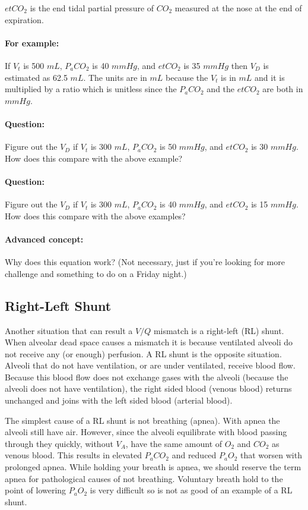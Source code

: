 $etCO_2$ is the end tidal partial pressure of $CO_2$ measured at the nose at the end of expiration.

\paragraph{For example:} If $V_t$ is 500 $mL$, $P_aCO_2$ is 40 $mmHg$, and $etCO_2$ is 35 $mmHg$ then $V_D$ is estimated as 62.5 $mL$. The units are in $mL$ because the $V_t$ is in $mL$ and it is multiplied by a ratio which is unitless since the $P_aCO_2$ and the $etCO_2$ are both in $mmHg$.

\paragraph{Question:} Figure out the $V_D$ if $V_t$ is 300 $mL$, $P_aCO_2$ is 50 $mmHg$, and $etCO_2$ is 30 $mmHg$. How does this compare with the above example? 

\paragraph{Question:} Figure out the $V_D$ if $V_t$ is 300 $mL$, $P_aCO_2$ is 40 $mmHg$, and $etCO_2$ is 15 $mmHg$. How does this compare with the above examples?

\paragraph{Advanced concept:} Why does this equation work? (Not necessary, just if you're looking for more challenge and something to do on a Friday night.)

\subsection{Right-Left Shunt}

Another situation that can result a $V/Q$ mismatch is a right-left (RL) shunt. When alveolar dead space causes a mismatch it is because ventilated alveoli do not receive any (or enough) perfusion. A RL shunt is the opposite situation. Alveoli that do not have ventilation, or are under ventilated, receive blood flow. Because this blood flow does not exchange gases with the alveoli (because the alveoli does not have ventilation), the right sided blood (venous blood) returns unchanged and joins with the left sided blood (arterial blood). 

The simplest cause of a RL shunt is not breathing (apnea). With apnea the alveoli still have air. However, since the alveoli equilibrate with blood passing through they quickly, without $V_A$, have the same amount of $O_2$ and $CO_2$ as venous blood. This results in elevated $P_aCO_2$ and reduced $P_aO_2$ that worsen with prolonged apnea. While holding your breath is apnea, we should reserve the term apnea for pathological causes of not breathing. Voluntary breath hold to the point of lowering $P_aO_2$ is very difficult so is not as good of an example of a RL shunt.

